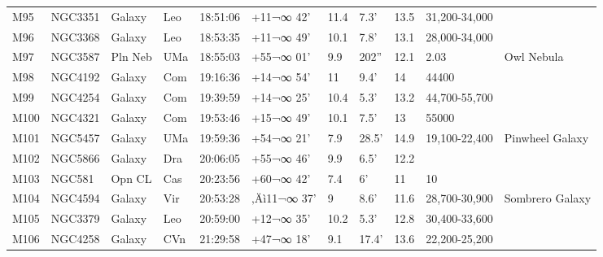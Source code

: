 \documentclass[10pt,twoside,a4paper,english]{report}
\begin{document}
\begin{longtable}{@{}lllllllllll@{}}
M95        & NGC3351     & Galaxy     & Leo       & 18:51:06 & +11¬∞ 42'  & 11.4      & 7.3'                 & 13.5     & 31,200-34,000       &                                           \\ 
M96        & NGC3368     & Galaxy     & Leo       & 18:53:35 & +11¬∞ 49'  & 10.1      & 7.8'                 & 13.1     & 28,000-34,000       &                                           \\ 
M97        & NGC3587     & Pln Neb    & UMa       & 18:55:03 & +55¬∞ 01'  & 9.9       & 202''                & 12.1     & 2.03                & Owl Nebula                                \\ 
M98        & NGC4192     & Galaxy     & Com       & 19:16:36 & +14¬∞ 54'  & 11        & 9.4'                 & 14       & 44400               &                                           \\ 
M99        & NGC4254     & Galaxy     & Com       & 19:39:59 & +14¬∞ 25'  & 10.4      & 5.3'                 & 13.2     & 44,700-55,700       &                                           \\ 
M100       & NGC4321     & Galaxy     & Com       & 19:53:46 & +15¬∞ 49'  & 10.1      & 7.5'                 & 13       & 55000               &                                           \\ 
M101       & NGC5457     & Galaxy     & UMa       & 19:59:36 & +54¬∞ 21'  & 7.9       & 28.5'                & 14.9     & 19,100-22,400       & Pinwheel Galaxy                           \\ 
M102       & NGC5866     & Galaxy     & Dra       & 20:06:05 & +55¬∞ 46'  & 9.9       & 6.5'                 & 12.2     &                     &                                           \\ 
M103       & NGC581      & Opn CL     & Cas       & 20:23:56 & +60¬∞ 42'  & 7.4       & 6'                   & 11       & 10                  &                                           \\ 
M104       & NGC4594     & Galaxy     & Vir       & 20:53:28 & ‚Äì11¬∞ 37'  & 9         & 8.6'                 & 11.6     & 28,700-30,900       & Sombrero Galaxy                           \\ 
M105       & NGC3379     & Galaxy     & Leo       & 20:59:00 & +12¬∞ 35'  & 10.2      & 5.3'                 & 12.8     & 30,400-33,600       &                                           \\ 
M106       & NGC4258     & Galaxy     & CVn       & 21:29:58 & +47¬∞ 18'  & 9.1       & 17.4'                & 13.6     & 22,200-25,200       &                                           \\ 

\end{longtable}
\end{document}
